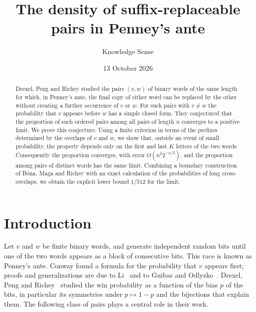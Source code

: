 \documentclass[11pt]{amsart}
\theoremstyle{remark}
\numberwithin{equation}{section}
\begin{document}
\title[Suffix-replaceable pairs in Penney's ante]{The density of suffix-replaceable pairs in Penney's ante}

\author{Knowledge Sense}

\date{13 October 2026}



\begin{abstract}
Drexel, Peng and Richey studied the pairs $(v,w)$ of binary words of the same length for which, in Penney's ante, the final copy of either word can be replaced by the other without creating a further occurrence of $v$ or $w$. For such pairs with $v\neq w$ the probability that $v$ appears before $w$ has a simple closed form. They conjectured that the proportion of such ordered pairs among all pairs of length $n$ converges to a positive limit. We prove this conjecture. Using a finite criterion in terms of the prefixes determined by the overlaps of $v$ and $w$, we show that, outside an event of small probability, the property depends only on the first and last $K$ letters of the two words. Consequently the proportion converges, with error $O(n^{2}2^{-n/3})$, and the proportion among pairs of distinct words has the same limit. Combining a boundary construction of Bóna, Maga and Richey with an exact calculation of the probabilities of long cross-overlaps, we obtain the explicit lower bound $1/512$ for the limit.
\end{abstract}

\maketitle

\section{Introduction}

Let $v$ and $w$ be finite binary words, and generate independent random bits until one of the two words appears as a block of consecutive bits. This race is known as Penney's ante. Conway found a formula for the probability that $v$ appears first; proofs and generalizations are due to Li~\cite{Li} and to Guibas and Odlyzko~\cite{GO}. Drexel, Peng and Richey~\cite{DPR} studied the win probability as a function of the bias $p$ of the bits, in particular its symmetries under $p\mapsto 1-p$ and the bijections that explain them. The following class of pairs plays a central role in their work.
\end{document}
